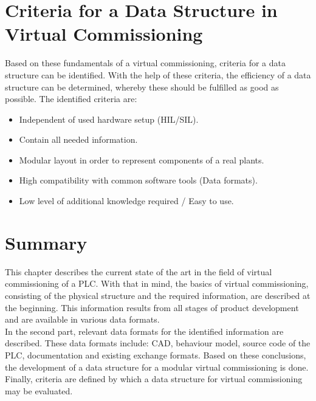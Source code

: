     


\section{Criteria for a Data Structure in Virtual Commissioning} \label{subsec:CriterionsForDataStructure}
    Based on these fundamentals of a virtual commissioning, criteria for a data structure can be identified. With the help of these criteria, the efficiency of a data structure can be determined, whereby these should be fulfilled as good as possible. The identified criteria are: 
    \begin{itemize}
        \item Independent of used hardware setup (HIL/SIL).
        \item Contain all needed information.
        \item Modular layout in order to represent components of a real plants.
        \item High compatibility with common software tools (Data formats).
        \item Low level of additional knowledge required / Easy to use.
    \end{itemize}


\section{Summary} 
    This chapter describes the current state of the art in the field of virtual commissioning of a PLC. With that in mind, the basics of virtual commissioning, consisting of the physical structure and the required information, are described at the beginning. This information results from all stages of product development and are available in various data formats. \\
    In the second part, relevant data formats for the identified information are described. These data formats include: CAD, behaviour model, source code of the PLC, documentation and existing exchange formats. Based on these conclusions, the development of a data structure for a modular virtual commissioning is done. \\
    Finally, criteria are defined by which a data structure for virtual commissioning may be evaluated.
  
  
  
